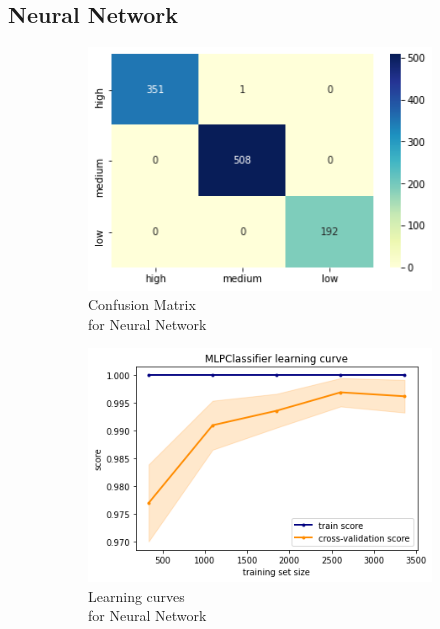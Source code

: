 \subsection{Neural Network}
\begin{figure}[h!]
     \captionsetup{justification=centering}             
     \centering
     \begin{subfigure}{0.49\textwidth}
         \centering
         \captionsetup{type=figure}
         \includegraphics[width=\textwidth]{img/classification/nn_confusion.png}
         \caption{Confusion Matrix \\ for Neural Network}
         \label{fig:nn_confusion}
     \end{subfigure}
     \begin{subfigure}{0.49\textwidth}
         \centering
         \includegraphics[width=\textwidth]{img/classification/nn_lc.png}
         \caption{Learning curves \\ for Neural Network}
         \label{fig:nn_lc}
     \end{subfigure}
     \caption{}
    \label{fig:nn}
\end{figure}

